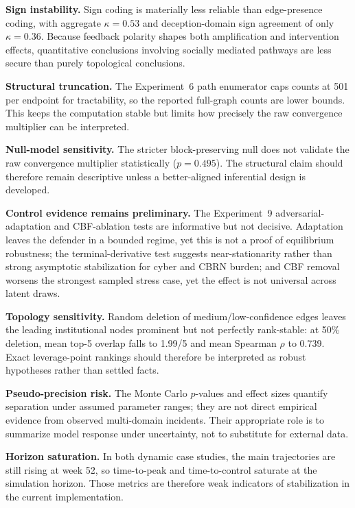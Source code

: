 \documentclass[11pt]{article}
\begin{document}
\textbf{Sign instability.} Sign coding is materially less reliable than edge-presence coding, with aggregate $\kappa = 0.53$ and deception-domain sign agreement of only $\kappa = 0.36$. Because feedback polarity shapes both amplification and intervention effects, quantitative conclusions involving socially mediated pathways are less secure than purely topological conclusions.

\textbf{Structural truncation.} The Experiment~6 path enumerator caps counts at 501 per endpoint for tractability, so the reported full-graph counts are lower bounds. This keeps the computation stable but limits how precisely the raw convergence multiplier can be interpreted.

\textbf{Null-model sensitivity.} The stricter block-preserving null does not validate the raw convergence multiplier statistically ($p = 0.495$). The structural claim should therefore remain descriptive unless a better-aligned inferential design is developed.

\textbf{Control evidence remains preliminary.} The Experiment~9 adversarial-adaptation and CBF-ablation tests are informative but not decisive. Adaptation leaves the defender in a bounded regime, yet this is not a proof of equilibrium robustness; the terminal-derivative test suggests near-stationarity rather than strong asymptotic stabilization for cyber and CBRN burden; and CBF removal worsens the strongest sampled stress case, yet the effect is not universal across latent draws.

\textbf{Topology sensitivity.} Random deletion of medium/low-confidence edges leaves the leading institutional nodes prominent but not perfectly rank-stable: at 50\% deletion, mean top-5 overlap falls to 1.99/5 and mean Spearman $\rho$ to 0.739. Exact leverage-point rankings should therefore be interpreted as robust hypotheses rather than settled facts.

\textbf{Pseudo-precision risk.} The Monte Carlo $p$-values and effect sizes quantify separation under assumed parameter ranges; they are not direct empirical evidence from observed multi-domain incidents. Their appropriate role is to summarize model response under uncertainty, not to substitute for external data.

\textbf{Horizon saturation.} In both dynamic case studies, the main trajectories are still rising at week 52, so time-to-peak and time-to-control saturate at the simulation horizon. Those metrics are therefore weak indicators of stabilization in the current implementation.
\end{document}
